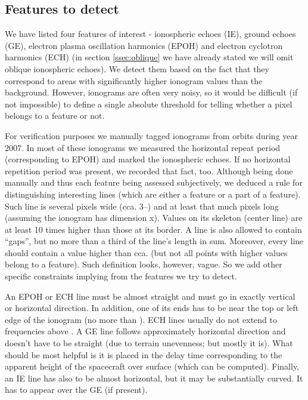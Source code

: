 \subsection{Features to detect}
We have listed four features of interest - ionospheric echoes (IE), ground echoes (GE), electron plasma oscillation harmonics (EPOH) and electron cyclotron harmonics (ECH) (in section \ref{ssec:oblique} we have already stated we will omit oblique ionospheric echoes). We detect them based on the fact that they correspond to areas with significantly higher ionogram values than the background. However, ionograms are often very noisy, so it would be difficult (if not impossible) to define a single absolute threshold for telling whether a pixel belongs to a feature or not. 

For verification purposes we manually tagged  ionograms from  orbits during year 2007. In most of these ionograms we measured the horizontal repeat period (corresponding to EPOH) and marked the ionospheric echoes. If no horizontal repetition period was present, we recorded that fact, too. Although being done manually and thus each feature being assessed subjectively, we deduced a rule for distinguishing interesting lines (which are either a feature or a part of a feature). Such line is several pixels wide (cca. 3--) and at least that much pixels long (assuming the ionogram has dimension x). Values on its skeleton (center line) are at least 10 times higher than those at its border. A line is also allowed to contain ``gaps'', but no more than a third of the line's length in sum. Moreover, every line should contain a value higher than cca.  (but not all points with higher values belong to a feature). Such definition looks, however, vague. So we add other specific constraints implying from the features we try to detect. 

An EPOH or ECH line must be almost straight and must go in exactly vertical or horizontal direction. In addition, one of its ends has to be near the top or left edge of the ionogram (no more than ). ECH lines usually do not extend to frequencies above . A GE line follows approximately horizontal direction and doesn't have to be straight (due to terrain unevenness; but mostly it is). What should be most helpful is it is placed in the delay time corresponding to the apparent height of the spacecraft over surface (which can be computed). Finally, an IE line has also to be almost horizontal, but it may be substantially curved. It has to appear over the GE (if present).

